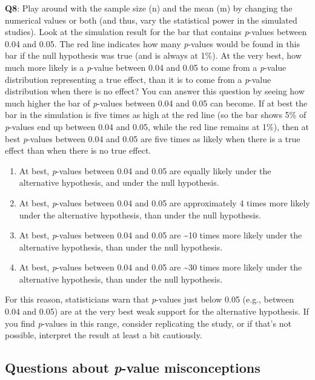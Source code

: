 \documentclass[
  oneside]{krantz}
\providecommand{\tightlist}{%
  \setlength{\itemsep}{0pt}\setlength{\parskip}{0pt}}
\begin{document}
\textbf{Q8}: Play around with the sample size (n) and the mean (m) by changing the numerical values or both (and thus, vary the statistical power in the simulated studies). Look at the simulation result for the bar that contains \emph{p}-values between 0.04 and 0.05. The red line indicates how many \emph{p}-values would be found in this bar if the null hypothesis was true (and is always at 1\%). At the very best, how much more likely is a \emph{p}-value between 0.04 and 0.05 to come from a \emph{p}-value distribution representing a true effect, than it is to come from a \emph{p}-value distribution when there is no effect? You can answer this question by seeing how much higher the bar of \emph{p}-values between 0.04 and 0.05 can become. If at best the bar in the simulation is five times as high at the red line (so the bar shows 5\% of \emph{p}-values end up between 0.04 and 0.05, while the red line remains at 1\%), then at best \emph{p}-values between 0.04 and 0.05 are five times as likely when there is a true effect than when there is no true effect.

\begin{enumerate}
\def\labelenumi{\Alph{enumi})}
\tightlist
\item
  At best, \emph{p}-values between 0.04 and 0.05 are equally likely under the
  alternative hypothesis, and under the null hypothesis.
\item
  At best, \emph{p}-values between 0.04 and 0.05 are approximately 4 times more
  likely under the alternative hypothesis, than under the null hypothesis.
\item
  At best, \emph{p}-values between 0.04 and 0.05 are \textasciitilde10 times more likely under the alternative hypothesis, than under the null hypothesis.
\item
  At best, \emph{p}-values between 0.04 and 0.05 are \textasciitilde30 times more likely under the alternative hypothesis, than under the null hypothesis.
\end{enumerate}

For this reason, statisticians warn that \emph{p}-values just below 0.05 (e.g.,
between 0.04 and 0.05) are at the very best weak support for the alternative
hypothesis. If you find \emph{p}-values in this range, consider replicating the
study, or if that's not possible, interpret the result at least a bit
cautiously.

\hypertarget{questions-about-p-value-misconceptions}{%
\subsection{\texorpdfstring{Questions about \emph{p}-value misconceptions}{Questions about p-value misconceptions}}\label{questions-about-p-value-misconceptions}}
\end{document}
